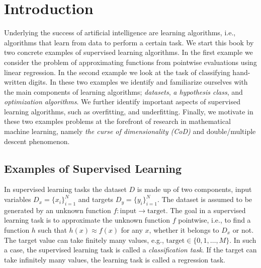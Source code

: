 \chapter{Introduction} %

\label{Chapter1} %
\setcounter{chapter}{1}

\newcommand{\keyword}[1]{\textbf{#1}}
\newcommand{\tabhead}[1]{\textbf{#1}}
\newcommand{\code}[1]{\texttt{#1}}
\newcommand{\file}[1]{\texttt{\bfseries#1}}
\newcommand{\option}[1]{\texttt{\itshape#1}}
Underlying the success of artificial intelligence are learning algorithms, i.e.,
algorithms that learn from data to perform a certain task. We start this book by
two concrete examples of supervised learning algorithms. In the first example we
consider the problem of approximating functions from pointwise evaluations using linear regression. In the second example we look at the task of
classifying hand-written digits. In these two examples we identify and
familiarize ourselves with the main components of learning algorithms;
\emph{datasets}, \emph{a hypothesis class}, and \emph{optimization algorithms}.
We further identify important aspects of supervised learning algorithms, such as
overfitting, and underfitting. Finally, we motivate in these two examples
problems at the forefront of research in mathematical machine learning, namely
\emph{the curse of dimensionality (CoD)} and double/multiple descent phenomenon. 
 
\section{Examples of Supervised Learning}
In supervised learning tasks the dataset $D$ is made up of
two components, input variables $D_x = \{x_i\}_{i = 1}^N$ and targets $D_y = \{y_i\}_{i=1}^N$. The dataset is assumed to be
generated by an unknown function $f: \text{input} \to \text{target}$. The goal in
a supervised learning task is to approximate the unknown function $f$ pointwise,
i.e., to find a function $h$ such that $h(x) \approx f(x)$ for any $x$, whether
it belongs to $D_x$ or not. The target value can take finitely many values,
e.g., $\text{target} \in \{0,1, \dots, M\}$. In such a case, the supervised
learning task is called a \emph{classification task}. If the target can take
infinitely many values, the learning task is called a regression task.  

